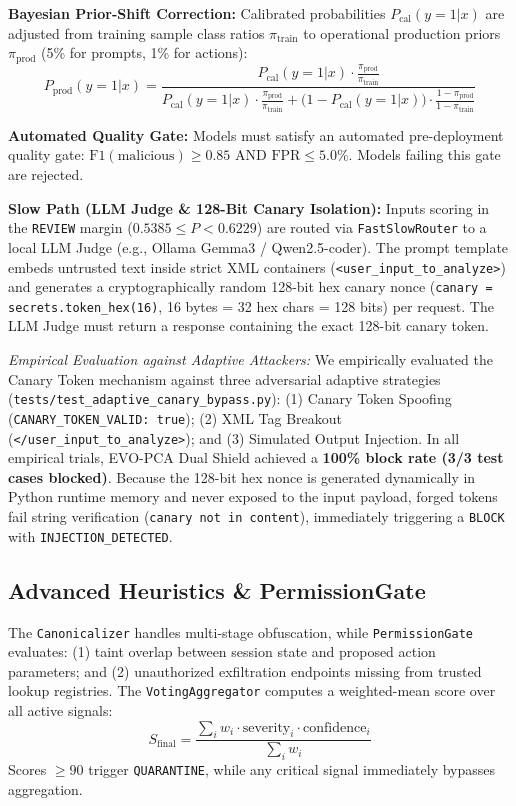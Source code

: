 \documentclass[runningheads]{llncs}
\begin{document}
\textbf{Bayesian Prior-Shift Correction:} Calibrated probabilities $P_{\text{cal}}(y=1|x)$ are adjusted from training sample class ratios $\pi_{\text{train}}$ to operational production priors $\pi_{\text{prod}}$ (5\% for prompts, 1\% for actions):
\begin{equation}
P_{\text{prod}}(y=1|x) = \frac{P_{\text{cal}}(y=1|x) \cdot \frac{\pi_{\text{prod}}}{\pi_{\text{train}}}}{P_{\text{cal}}(y=1|x) \cdot \frac{\pi_{\text{prod}}}{\pi_{\text{train}}} + \big(1 - P_{\text{cal}}(y=1|x)\big) \cdot \frac{1 - \pi_{\text{prod}}}{1 - \pi_{\text{train}}}}
\end{equation}

\textbf{Automated Quality Gate:} Models must satisfy an automated pre-deployment quality gate: $\text{F1}(\text{malicious}) \ge 0.85$ AND $\text{FPR} \le 5.0\%$. Models failing this gate are rejected.

\textbf{Slow Path (LLM Judge \& 128-Bit Canary Isolation):} Inputs scoring in the \texttt{REVIEW} margin ($0.5385 \le P < 0.6229$) are routed via \texttt{FastSlowRouter} to a local LLM Judge (e.g., Ollama Gemma3 / Qwen2.5-coder). The prompt template embeds untrusted text inside strict XML containers (\texttt{<user\_input\_to\_analyze>}) and generates a cryptographically random 128-bit hex canary nonce (\texttt{canary = secrets.token\_hex(16)}, 16 bytes = 32 hex chars = 128 bits) per request. The LLM Judge must return a response containing the exact 128-bit canary token.

\textit{Empirical Evaluation against Adaptive Attackers:} We empirically evaluated the Canary Token mechanism against three adversarial adaptive strategies (\texttt{tests/\allowbreak test\_adaptive\allowbreak\_canary\allowbreak\_bypass.py}): (1) Canary Token Spoofing (\texttt{CANARY\_TOKEN\_VALID: true}); (2) XML Tag Breakout (\texttt{</user\_input\_to\_analyze>}); and (3) Simulated Output Injection. In all empirical trials, EVO-PCA Dual Shield achieved a \textbf{100\% block rate (3/3 test cases blocked)}. Because the 128-bit hex nonce is generated dynamically in Python runtime memory and never exposed to the input payload, forged tokens fail string verification (\texttt{canary not in content}), immediately triggering a \texttt{BLOCK} with \texttt{INJECTION\_DETECTED}.

\subsection{Advanced Heuristics \& PermissionGate}
The \texttt{Canonicalizer} handles multi-stage obfuscation, while \texttt{PermissionGate} evaluates: (1) taint overlap between session state and proposed action parameters; and (2) unauthorized exfiltration endpoints missing from trusted lookup registries. The \texttt{VotingAggregator} computes a weighted-mean score over all active signals:
\begin{equation}
S_{\text{final}} = \frac{\sum_{i} w_i \cdot \text{severity}_i \cdot \text{confidence}_i}{\sum_i w_i}
\end{equation}
Scores $\ge 90$ trigger \texttt{QUARANTINE}, while any critical signal immediately bypasses aggregation.
\end{document}
